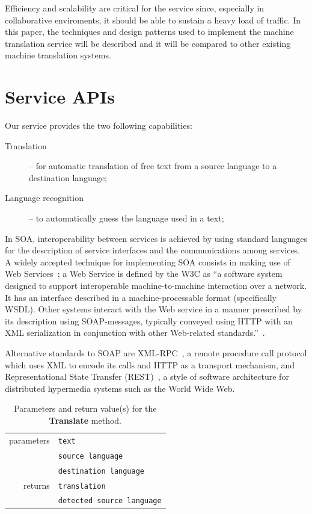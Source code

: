 \documentclass[11pt]{article}
\begin{document}
Efficiency and scalability are critical for the service since, especially in collaborative enviroments, it should be able to sustain a heavy load of traffic. In this paper, the techniques and design patterns used to implement the machine translation service will be described and it will be compared to other existing machine translation systems.



\section{Service APIs}

Our service provides the two following capabilities:

\begin{description}
  \item[Translation] -- for automatic translation of free text from a source language to a destination language;
  \item[Language recognition] -- to automatically guess the language used in a text;
\end{description}

In SOA, interoperability between services is achieved by using standard languages for the description of service interfaces and the communications among services. A widely accepted technique for implementing SOA consists in making use of Web Services~\citep{soa}; a Web  Service is defined by the W3C as ``a software system designed to support interoperable machine-to-machine interaction over a network. It has an interface described in a machine-processable format (specifically WSDL). Other systems interact with the Web service in a manner prescribed by its description using SOAP-messages, typically conveyed using HTTP with an XML serialization in conjunction with other Web-related standards.''~\citep{wsgloss}. 

Alternative standards to SOAP are XML-RPC~\citep{xmlrpcspec}, a remote procedure call protocol which uses XML to encode its calls and HTTP as a transport mechanism, and Representational State Transfer (REST)~\citep{rest}, a style of software architecture for distributed hypermedia systems such as the World Wide Web.

\begin{table}[!ht]
\begin{center}
 \begin{tabular}{|r|l|}
  \hline
   parameters	& {\tt\small text} \\ \cline{2-2}
   				& {\tt\small source language} \\ \cline{2-2}
   				& {\tt\small destination language} \\
  \hline \hline
   returns 	& {\tt\small translation} \\ \cline{2-2}
   			& {\tt\small detected source language} \\
  \hline
 \end{tabular}
\end{center}
\caption{Parameters and return value(s) for the {\bf Translate} method.}
\label{tab:translate}
\end{table}
\end{document}
